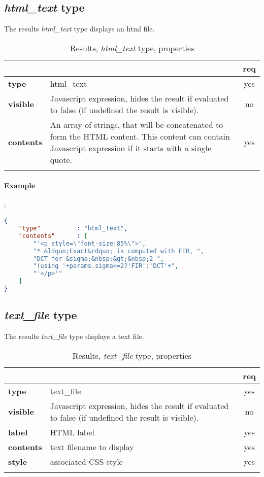 \subsection{ \emph{html\_text} type}

The results \emph{html\_text} type displays an html file.

\begin{longtable}{|>{\bf}L{\linewidth}|L{\linewidth}|c|}
\hline
{}     &  & {\bf req} \tabularnewline 
\hline \hline
 type      & html\_text  & yes \\ \hline
 visible    & Javascript expression, hides the result if
              evaluated to false (if undefined the result is visible).& no \\ \hline
 contents  & An array of strings, that will be concatenated to form the HTML 
             content. This content can contain Javascript expression if it starts
            with a single quote. & yes \\ \hline
\caption{Results, \emph{html\_text} type, properties}
\end{longtable}

\paragraph{Example}:\\
\begin{lstlisting}[language=json,firstnumber=1]
{ 
    "type"          : "html_text", 
    "contents"      : [
        "'<p style=\"font-size:85%\">",
        "* &ldquo;Exact&rdquo; is computed with FIR, ",
        "DCT for &sigma;&nbsp;&gt;&nbsp;2 ",
        "(using '+params.sigma<=2?'FIR':'DCT'+",
        "'</p>'" 
    ] 
}
\end{lstlisting}


\subsection{ \emph{text\_file} type}

The results \emph{text\_file} type displays a text file.

\begin{longtable}{|>{\bf}L{\linewidth}|L{\linewidth}|c|}
\hline
{}     &  & {\bf req} \tabularnewline 
\hline \hline
 type      & text\_file  & yes \\ \hline
 visible    & Javascript expression, hides the result if
              evaluated to false (if undefined the result is visible).& no \\ \hline
 label     & HTML label & yes \\ \hline
 contents  & text filename to display & yes \\ \hline
 style     & associated CSS style & yes \\ \hline
\caption{Results, \emph{text\_file} type, properties}
\end{longtable}

